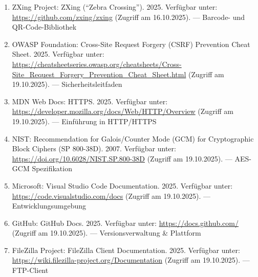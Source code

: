 \begin{enumerate}
  \item ZXing Project: ZXing (“Zebra Crossing”). 2025. Verfügbar unter: \url{https://github.com/zxing/zxing} (Zugriff am 16.10.2025). — Barcode- und QR-Code-Bibliothek
  \item OWASP Foundation: Cross-Site Request Forgery (CSRF) Prevention Cheat Sheet. 2025. Verfügbar unter: \url{https://cheatsheetseries.owasp.org/cheatsheets/Cross-Site_Request_Forgery_Prevention_Cheat_Sheet.html} (Zugriff am 19.10.2025). — Sicherheitsleitfaden
  \item MDN Web Docs: HTTPS. 2025. Verfügbar unter: \url{https://developer.mozilla.org/docs/Web/HTTP/Overview} (Zugriff am 19.10.2025). — Einführung in HTTP/HTTPS
  \item NIST: Recommendation for Galois/Counter Mode (GCM) for Cryptographic Block Ciphers (SP 800-38D). 2007. Verfügbar unter: \url{https://doi.org/10.6028/NIST.SP.800-38D} (Zugriff am 19.10.2025). — AES-GCM Spezifikation
  \item Microsoft: Visual Studio Code Documentation. 2025. Verfügbar unter: \url{https://code.visualstudio.com/docs} (Zugriff am 19.10.2025). — Entwicklungsumgebung
  \item GitHub: GitHub Docs. 2025. Verfügbar unter: \url{https://docs.github.com/} (Zugriff am 19.10.2025). — Versionsverwaltung \& Plattform
  \item FileZilla Project: FileZilla Client Documentation. 2025. Verfügbar unter: \url{https://wiki.filezilla-project.org/Documentation} (Zugriff am 19.10.2025). — FTP-Client
\end{enumerate}
